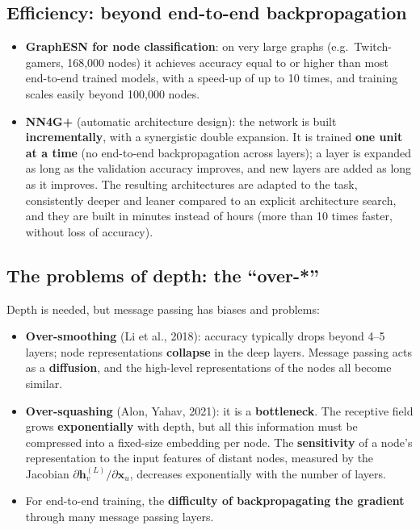 \subsection{Efficiency: beyond end-to-end
backpropagation}\label{efficienza-oltre-la-backpropagation-end-to-end}

\begin{itemize}
\tightlist
\item
  \textbf{GraphESN for node classification}: on very large graphs
  (e.g.\ Twitch-gamers, 168,000 nodes) it achieves accuracy equal to or
  higher than most end-to-end trained models, with a speed-up of up to
  10 times, and training scales easily beyond 100,000 nodes.
\item
  \textbf{NN4G+} (automatic architecture design): the network is built
  \textbf{incrementally}, with a synergistic double expansion. It is
  trained \textbf{one unit at a time} (no end-to-end backpropagation
  across layers); a layer is expanded as long as the validation
  accuracy improves, and new layers are added as long as it improves.
  The resulting architectures are adapted to the task, consistently
  deeper and leaner compared to an explicit architecture search, and
  they are built in minutes instead of hours (more than 10 times
  faster, without loss of accuracy).
\end{itemize}

\subsection{The problems of depth: the
``over-*''}\label{i-problemi-della-profondituxe0-gli-over-}

Depth is needed, but message passing has biases and problems:

\begin{itemize}
\tightlist
\item
  \textbf{Over-smoothing} (Li et al., 2018): accuracy typically drops
  beyond 4--5 layers; node representations \textbf{collapse} in the
  deep layers. Message passing acts as a \textbf{diffusion}, and the
  high-level representations of the nodes all become similar.
\item
  \textbf{Over-squashing} (Alon, Yahav, 2021): it is a
  \textbf{bottleneck}. The receptive field grows
  \textbf{exponentially} with depth, but all this information must be
  compressed into a fixed-size embedding per node. The
  \textbf{sensitivity} of a node's representation to the input features
  of distant nodes, measured by the Jacobian
  \(\partial\mathbf{h}_v^{(L)}/\partial\mathbf{x}_u\), decreases
  exponentially with the number of layers.
\item
  For end-to-end training, the \textbf{difficulty of backpropagating
  the gradient} through many message passing layers.
\end{itemize}

